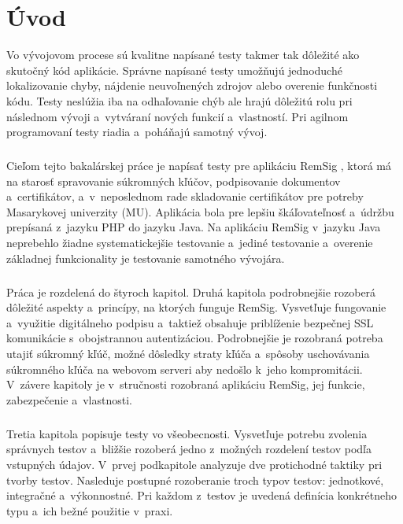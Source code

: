\documentclass[
  digital, %
  table,   %
oneside,
  nolof,     %
  nolot,     %
]{fithesis3}
\begin{document}
\chapter{Úvod}
Vo vývojovom procese sú kvalitne napísané testy takmer tak dôležité ako skutočný kód aplikácie. Správne napísané testy umožňujú jednoduché lokalizovanie chyby, nájdenie neuvoľnených zdrojov alebo overenie funkčnosti kódu. Testy neslúžia iba na odhaľovanie chýb ale hrajú dôležitú rolu pri následnom vývoji a~vytváraní nových funkcií a~vlastností. Pri agilnom programovaní \cite{agileDef} testy riadia a~poháňajú samotný vývoj. \paragraph{}
Cieľom tejto bakalárskej práce je napísať testy pre aplikáciu RemSig \cite{remsigMuni}, ktorá má na starosť spravovanie súkromných kľúčov, podpisovanie dokumentov a~certifikátov, a~v~neposlednom rade skladovanie certifikátov pre potreby Masarykovej univerzity (MU). Aplikácia bola pre lepšiu škáľovateľnosť a~údržbu prepísaná z~jazyku PHP do jazyku Java. Na aplikáciu RemSig  v~jazyku Java neprebehlo žiadne systematickejšie testovanie a~jediné testovanie a~overenie základnej funkcionality je testovanie samotného vývojára.\paragraph{}
Práca je rozdelená do štyroch kapitol. Druhá kapitola podrobnejšie rozoberá dôležité aspekty a~princípy, na ktorých funguje RemSig. Vysvetľuje fungovanie a~využitie digitálneho podpisu a~taktiež obsahuje priblíženie bezpečnej SSL komunikácie s~obojstrannou autentizáciou. Podrobnejšie je rozobraná potreba utajiť súkromný kľúč, možné dôsledky straty kľúča a~spôsoby uschovávania súkromného kľúča na webovom serveri aby nedošlo k~jeho kompromitácii. V~závere kapitoly  je v~stručnosti rozobraná aplikáciu RemSig, jej funkcie, zabezpečenie a~vlastnosti. \paragraph{}
Tretia kapitola popisuje testy vo všeobecnosti. Vysvetľuje potrebu zvolenia správnych testov a~bližšie rozoberá jedno z~možných rozdelení testov podľa vstupných údajov. V~prvej podkapitole analyzuje dve protichodné taktiky pri tvorby testov. Nasleduje postupné rozoberanie troch typov testov: jednotkové, integračné a~výkonnostné. Pri každom z~testov je uvedená definícia konkrétneho typu a~ich bežné použitie v~praxi.\paragraph{}
\end{document}
